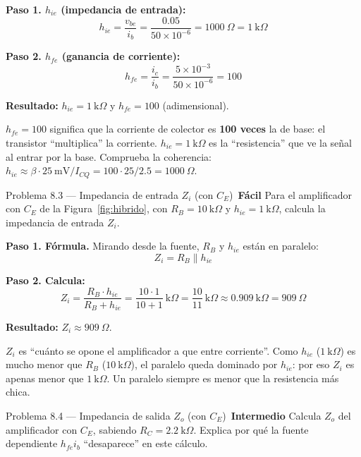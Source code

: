 \documentclass[11pt,a4paper]{article}
\newcommand{\facil}{\textcolor{verdeSignal}{\faIcon{circle}\,\textbf{Fácil}}}
\newcommand{\intermedio}{\textcolor{naranjaVivo}{\faIcon{circle}\,\textbf{Intermedio}}}
\begin{document}
\begin{solucionBox}
\textbf{Paso 1. $h_{ie}$ (impedancia de entrada):}
\[
h_{ie}=\frac{v_{be}}{i_b}=\frac{0.05}{50\times10^{-6}}=1000\ \Omega=1\ \text{k}\Omega
\]

\textbf{Paso 2. $h_{fe}$ (ganancia de corriente):}
\[
h_{fe}=\frac{i_c}{i_b}=\frac{5\times10^{-3}}{50\times10^{-6}}=100
\]

\textbf{Resultado:} $h_{ie}=1\ \text{k}\Omega$ y $h_{fe}=100$ (adimensional).
\end{solucionBox}

\begin{porqueBox}
$h_{fe}=100$ significa que la corriente de colector es \textbf{100 veces} la de base: el transistor ``multiplica'' la corriente. $h_{ie}=1\ \text{k}\Omega$ es la ``resistencia'' que ve la señal al entrar por la base. Comprueba la coherencia: $h_{ie}\approx\beta\cdot 25\ \text{mV}/I_{CQ}=100\cdot25/2.5=1000\ \Omega$. \ \checkmark
\end{porqueBox}

\begin{problemaBox}{Problema 8.3 --- Impedancia de entrada $Z_i$ (con $C_E$) \quad \facil}
Para el amplificador con $C_E$ de la Figura~\ref{fig:hibrido}, con $R_B=10\ \text{k}\Omega$ y $h_{ie}=1\ \text{k}\Omega$, calcula la impedancia de entrada $Z_i$.
\end{problemaBox}

\begin{solucionBox}
\textbf{Paso 1. Fórmula.} Mirando desde la fuente, $R_B$ y $h_{ie}$ están en paralelo:
\[
Z_i=R_B\parallel h_{ie}
\]

\textbf{Paso 2. Calcula:}
\[
Z_i=\frac{R_B\cdot h_{ie}}{R_B+h_{ie}}=\frac{10\cdot1}{10+1}\ \text{k}\Omega=\frac{10}{11}\ \text{k}\Omega\approx0.909\ \text{k}\Omega=909\ \Omega
\]

\textbf{Resultado:} $Z_i\approx 909\ \Omega$.
\end{solucionBox}

\begin{porqueBox}
$Z_i$ es ``cuánto se opone el amplificador a que entre corriente''. Como $h_{ie}$ ($1\ \text{k}\Omega$) es mucho menor que $R_B$ ($10\ \text{k}\Omega$), el paralelo queda dominado por $h_{ie}$: por eso $Z_i$ es apenas menor que $1\ \text{k}\Omega$. Un paralelo siempre es menor que la resistencia más chica.
\end{porqueBox}

\begin{problemaBox}{Problema 8.4 --- Impedancia de salida $Z_o$ (con $C_E$) \quad \intermedio}
Calcula $Z_o$ del amplificador con $C_E$, sabiendo $R_C=2.2\ \text{k}\Omega$. Explica por qué la fuente dependiente $h_{fe}i_b$ ``desaparece'' en este cálculo.
\end{problemaBox}
\end{document}
